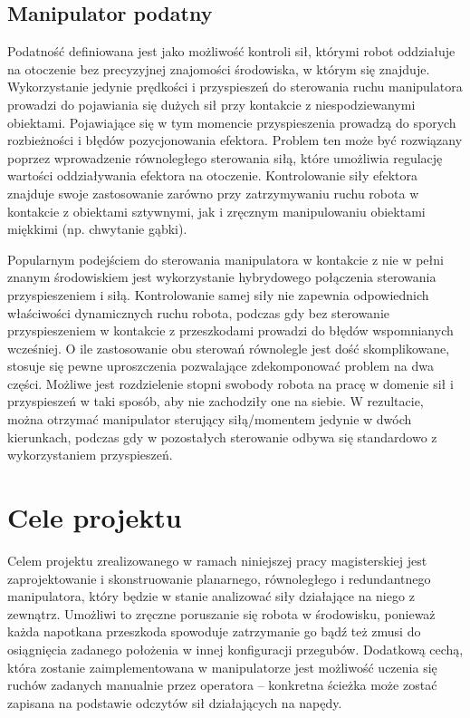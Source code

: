 \documentclass[printmode]{mgr}
\begin{document}
\section{Manipulator podatny}
Podatność \cite{handbook} definiowana jest jako możliwość kontroli sił, którymi robot oddziałuje
na otoczenie bez precyzyjnej znajomości środowiska, w którym się znajduje. Wykorzystanie jedynie prędkości i przyspieszeń
do sterowania ruchu manipulatora prowadzi do pojawiania się dużych sił przy kontakcie z niespodziewanymi obiektami. Pojawiające się
w tym momencie przyspieszenia prowadzą do sporych rozbieżności i błędów pozycjonowania efektora. Problem ten może być
rozwiązany poprzez wprowadzenie równoległego sterowania siłą, które umożliwia regulację wartości oddziaływania efektora
na otoczenie. Kontrolowanie siły efektora znajduje swoje zastosowanie zarówno przy zatrzymywaniu ruchu robota w kontakcie z
obiektami sztywnymi, jak i zręcznym manipulowaniu obiektami miękkimi (np. chwytanie gąbki).

Popularnym podejściem do sterowania manipulatora w kontakcie z nie w pełni znanym środowiskiem jest wykorzystanie hybrydowego
połączenia sterowania przyspieszeniem i siłą. Kontrolowanie samej siły nie zapewnia odpowiednich właściwości dynamicznych ruchu
robota, podczas gdy bez sterowanie przyspieszeniem w kontakcie z przeszkodami prowadzi do błędów wspomnianych wcześniej. 
O ile zastosowanie obu sterowań równolegle jest dość skomplikowane, stosuje się pewne uproszczenia pozwalające zdekomponować
problem na dwa części. Możliwe jest rozdzielenie stopni swobody robota na pracę w domenie sił i przyspieszeń w taki sposób,
aby nie zachodziły one na siebie. W rezultacie, można otrzymać manipulator sterujący siłą/momentem jedynie w dwóch kierunkach,
podczas gdy w pozostałych sterowanie odbywa się standardowo z wykorzystaniem przyspieszeń.


\chapter{Cele projektu} \label{ch:cele}
Celem projektu zrealizowanego w ramach niniejszej pracy magisterskiej jest zaprojektowanie i skonstruowanie planarnego, równoległego
i redundantnego manipulatora, który będzie w stanie analizować siły działające na niego z zewnątrz. Umożliwi to 
zręczne poruszanie się robota w środowisku, ponieważ każda napotkana przeszkoda spowoduje zatrzymanie go bądź też zmusi
do osiągnięcia zadanego położenia w innej konfiguracji przegubów. Dodatkową cechą, która zostanie zaimplementowana w manipulatorze
jest możliwość uczenia się ruchów zadanych manualnie przez operatora -- konkretna ścieżka może zostać zapisana na podstawie
odczytów sił działających na napędy. 
\end{document}
